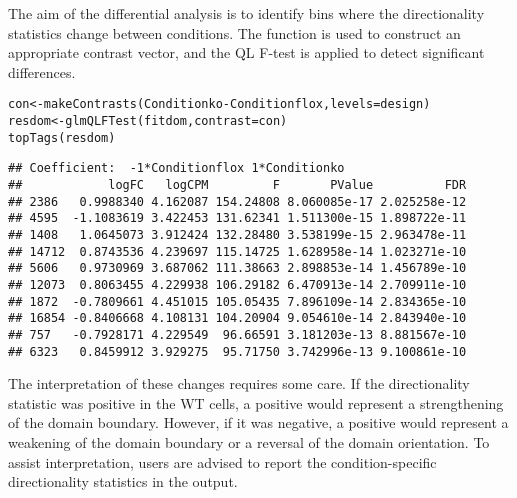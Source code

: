 \documentclass{report}\usepackage[]{graphicx}\usepackage[usenames,dvipsnames]{color}
\newcommand{\hlopt}[1]{\textcolor[rgb]{0,0,0}{#1}}%
\newcommand{\hlstd}[1]{\textcolor[rgb]{0.251,0.251,0.251}{#1}}%
\newcommand{\hlkwb}[1]{\textcolor[rgb]{0,0,0}{#1}}%
\newcommand{\hlkwc}[1]{\textcolor[rgb]{0.251,0.251,0.251}{#1}}%
\newcommand{\hlkwd}[1]{\textcolor[rgb]{0.878,0.439,0.125}{#1}}%
\newenvironment{knitrout}{}{} %
\begin{document}
The aim of the differential analysis is to identify bins where the directionality statistics change between conditions.
The  function is used to construct an appropriate contrast vector, and the QL F-test is applied to detect significant differences.

\begin{knitrout}
\color{fgcolor}\begin{kframe}
\begin{alltt}
\hlstd{con} \hlkwb{<-} \hlkwd{makeContrasts}\hlstd{(Conditionko} \hlopt{-} \hlstd{Conditionflox,} \hlkwc{levels}\hlstd{=design)}
\hlstd{resdom} \hlkwb{<-} \hlkwd{glmQLFTest}\hlstd{(fitdom,} \hlkwc{contrast}\hlstd{=con)}
\hlkwd{topTags}\hlstd{(resdom)}
\end{alltt}
\begin{verbatim}
## Coefficient:  -1*Conditionflox 1*Conditionko 
##            logFC   logCPM         F       PValue          FDR
## 2386   0.9988340 4.162087 154.24808 8.060085e-17 2.025258e-12
## 4595  -1.1083619 3.422453 131.62341 1.511300e-15 1.898722e-11
## 1408   1.0645073 3.912424 132.28480 3.538199e-15 2.963478e-11
## 14712  0.8743536 4.239697 115.14725 1.628958e-14 1.023271e-10
## 5606   0.9730969 3.687062 111.38663 2.898853e-14 1.456789e-10
## 12073  0.8063455 4.229938 106.29182 6.470913e-14 2.709911e-10
## 1872  -0.7809661 4.451015 105.05435 7.896109e-14 2.834365e-10
## 16854 -0.8406668 4.108131 104.20904 9.054610e-14 2.843940e-10
## 757   -0.7928171 4.229549  96.66591 3.181203e-13 8.881567e-10
## 6323   0.8459912 3.929275  95.71750 3.742996e-13 9.100861e-10
\end{verbatim}
\end{kframe}
\end{knitrout}

The interpretation of these changes requires some care.
If the directionality statistic was positive in the WT cells, a positive  would represent a strengthening of the domain boundary.
However, if it was negative, a positive  would represent a weakening of the domain boundary or a reversal of the domain orientation.
To assist interpretation, users are advised to report the condition-specific directionality statistics in the output.
\end{document}
